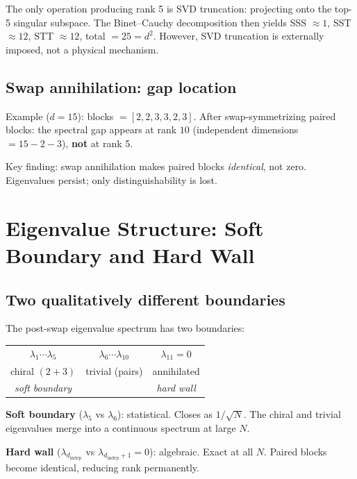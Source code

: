 \documentclass[12pt]{article}
\theoremstyle{remark}
\begin{document}
{The only operation producing rank 5 is SVD truncation: projecting onto the top-5 singular subspace. The Binet--Cauchy decomposition then yields SSS $\approx 1$, SST $\approx 12$, STT $\approx 12$, total $= 25 = d^2$. However, SVD truncation is externally imposed, not a physical mechanism.

\subsection{Swap annihilation: gap location}

Example ($d=15$): blocks $= [2, 2, 3, 3, 2, 3]$. After swap-symmetrizing paired blocks: the spectral gap appears at rank $10$ (independent dimensions $= 15 - 2 - 3$), \textbf{not} at rank 5.

Key finding: swap annihilation makes paired blocks \emph{identical}, not zero. Eigenvalues persist; only distinguishability is lost.

\section{Eigenvalue Structure: Soft Boundary and Hard Wall}

\subsection{Two qualitatively different boundaries}

The post-swap eigenvalue spectrum has two boundaries:

\begin{center}
\begin{tabular}{ccc}
$\lambda_1 \cdots \lambda_5$ & $\lambda_6 \cdots \lambda_{10}$ & $\lambda_{11} = 0$ \\
chiral $(2+3)$ & trivial (pairs) & annihilated \\
\emph{soft boundary} & & \emph{hard wall} \\
\end{tabular}
\end{center}

\textbf{Soft boundary} ($\lambda_5$ vs $\lambda_6$): statistical. Closes as $1/\sqrt{N}$. The chiral and trivial eigenvalues merge into a continuous spectrum at large $N$.

\textbf{Hard wall} ($\lambda_{d_\text{indep}}$ vs $\lambda_{d_\text{indep}+1} = 0$): algebraic. Exact at all $N$. Paired blocks become identical, reducing rank permanently.

}
\end{document}
